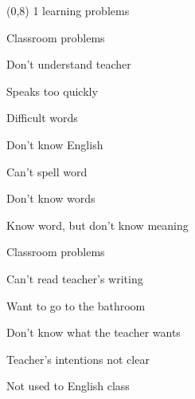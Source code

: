\documentclass[b5paper]{article}
\newcommand{\mycard}[5]{%
	\small #1 #2
	\par
	\parbox{7.5cm}{%
	\Large#3\\
	\normalsize#4 #5
	}
}
\begin{document}
\begin{textblock}{8}(0,8)
\mycard{1}{learning problems}{Classroom problems}{
\begin{description}
	\item Don't understand teacher 
	\begin{description}
		\item Speaks too quickly
		\item Difficult words
	\end{description}
	\item Don't know English
	\begin{description}
		\item Can't spell word
		\item Don't know words
		\item Know word, but don't know meaning
	\end{description}
	\item Classroom problems
	\begin{description}
		\item Can't read teacher's writing
		\item Want to go to the bathroom
	\end{description}
	\item Don't know what the teacher wants
	\begin{description}
		\item Teacher's intentions not clear
		\item Not used to English class
	\end{description}
\end{description}
}{}
\end{textblock}
\end{document}
